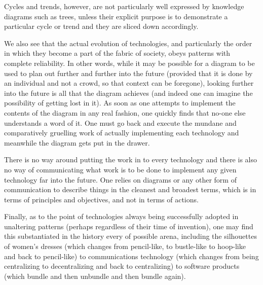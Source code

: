 \documentclass{article}
\begin{document}
Cycles and trends, however, are not particularly well expressed by knowledge diagrams such as trees, unless their explicit purpose is to demonstrate a particular cycle or trend and they are sliced down accordingly.

We also see that the actual evolution of technologies, and particularly the order in which they become a part of the fabric of society, obeys patterns with complete reliability. In other words, while it may be possible for a diagram to be used to plan out further and further into the future (provided that it is done by an individual and not a crowd, so that context can be foregone), looking further into the future is all that the diagram achieves (and indeed one can imagine the possibility of getting lost in it). As soon as one attempts to implement the contents of the diagram in any real fashion, one quickly finds that no-one else understands a word of it. One must go back and execute the mundane and comparatively gruelling work of actually implementing each technology and meanwhile the diagram gets put in the drawer.

There is no way around putting the work in to every technology and there is also no way of communicating what work is to be done to implement any given technology far into the future. One relies on diagrams or any other form of communication to describe things in the cleanest and broadest terms, which is in terms of principles and objectives, and not in terms of actions.

Finally, as to the point of technologies always being successfully adopted in unaltering patterns (perhaps regardless of their time of invention), one may find this substantiated in the history every of possible arena, including the silhouettes of women's dresses (which changes from pencil-like, to bustle-like to hoop-like and back to pencil-like) to communications technology (which changes from being centralizing to decentralizing and back to centralizing) to software products (which bundle and then unbundle and then bundle again).
\end{document}
